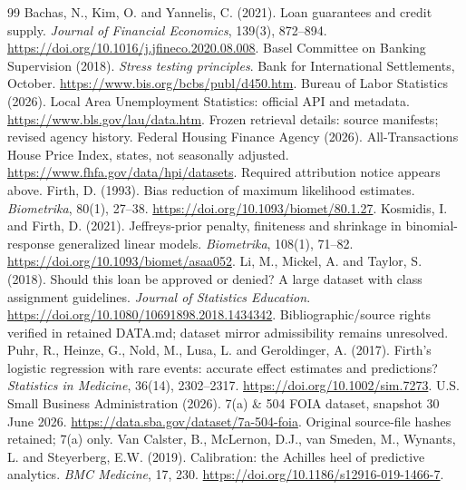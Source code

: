 \begin{thebibliography}{99}
 Bachas, N., Kim, O. and Yannelis, C. (2021). Loan guarantees and credit supply. \emph{Journal of Financial Economics}, 139(3), 872--894. \url{https://doi.org/10.1016/j.jfineco.2020.08.008}.
 Basel Committee on Banking Supervision (2018). \emph{Stress testing principles}. Bank for International Settlements, October. \url{https://www.bis.org/bcbs/publ/d450.htm}.
 Bureau of Labor Statistics (2026). Local Area Unemployment Statistics: official API and metadata. \url{https://www.bls.gov/lau/data.htm}. Frozen retrieval details: source manifests; revised agency history.
 Federal Housing Finance Agency (2026). All-Transactions House Price Index, states, not seasonally adjusted. \url{https://www.fhfa.gov/data/hpi/datasets}. Required attribution notice appears above.
 Firth, D. (1993). Bias reduction of maximum likelihood estimates. \emph{Biometrika}, 80(1), 27--38. \url{https://doi.org/10.1093/biomet/80.1.27}.
 Kosmidis, I. and Firth, D. (2021). Jeffreys-prior penalty, finiteness and shrinkage in binomial-response generalized linear models. \emph{Biometrika}, 108(1), 71--82. \url{https://doi.org/10.1093/biomet/asaa052}.
 Li, M., Mickel, A. and Taylor, S. (2018). Should this loan be approved or denied? A large dataset with class assignment guidelines. \emph{Journal of Statistics Education}. \url{https://doi.org/10.1080/10691898.2018.1434342}. Bibliographic/source rights verified in retained DATA.md; dataset mirror admissibility remains unresolved.
 Puhr, R., Heinze, G., Nold, M., Lusa, L. and Geroldinger, A. (2017). Firth's logistic regression with rare events: accurate effect estimates and predictions? \emph{Statistics in Medicine}, 36(14), 2302--2317. \url{https://doi.org/10.1002/sim.7273}.
 U.S. Small Business Administration (2026). 7(a) \& 504 FOIA dataset, snapshot 30 June 2026. \url{https://data.sba.gov/dataset/7a-504-foia}. Original source-file hashes retained; 7(a) only.
 Van Calster, B., McLernon, D.J., van Smeden, M., Wynants, L. and Steyerberg, E.W. (2019). Calibration: the Achilles heel of predictive analytics. \emph{BMC Medicine}, 17, 230. \url{https://doi.org/10.1186/s12916-019-1466-7}.
\end{thebibliography}

